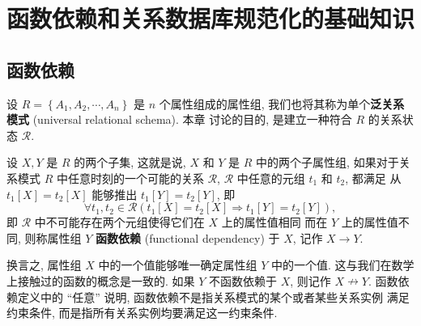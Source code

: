 \documentclass[10pt,UTF8]{book} %
\begin{document}
\newpage
\thispagestyle{empty}

\chapter{函数依赖和关系数据库规范化的基础知识}

\section{函数依赖}

设 $R = \left\{ A_1, A_2, \cdots, A_n \right\}$ 是 $n$ 个属性组成的属性组,
我们也将其称为单个\textbf{泛关系模式} (universal relational schema). 本章
讨论的目的, 是建立一种符合 $R$ 的关系状态 $\mathcal{R}$.

\begin{definition}
    设 $X, Y$ 是 $R$ 的两个子集, 这就是说, $X$ 和 $Y$ 是 $R$ 中的两个子属性组,
    如果对于关系模式 $R$ 中任意时刻的一个可能的关系 $\mathcal{R}$,
    {\kaishu $\mathcal{R}$ 中任意的元组 $t_1$ 和 $t_2$, 都满足
    从 $t_1[X] = t_2[X]$ 能够推出 $t_1[Y] = t_2[Y]$}, 即
    \[ \forall t_1, t_2 \in \mathcal{R} \left(
        t_1[X] = t_2[X] \Rightarrow t_1[Y] = t_2[Y]
    \right), \]
    即 $\mathcal{R}$ 中不可能存在两个元组使得它们在 $X$ 上的属性值相同
    而在 $Y$ 上的属性值不同,
    则称属性组 $Y$ \textbf{函数依赖} (functional dependency) 于 $X$,
    记作 $X \to Y$.
\end{definition}

换言之, 属性组 $X$ 中的一个值能够唯一确定属性组 $Y$ 中的一个值.
这与我们在数学上接触过的函数的概念是一致的.
如果 $Y$ 不函数依赖于 $X$, 则记作 $X \nrightarrow Y$.
函数依赖定义中的 “任意” 说明, 函数依赖不是指关系模式的某个或者某些关系实例
满足约束条件, 而是指所有关系实例均要满足这一约束条件.
\end{document}
